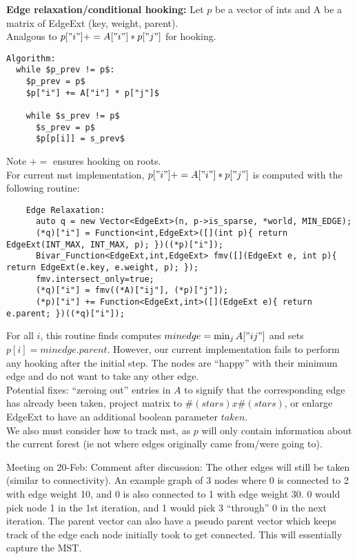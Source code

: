 \documentclass[11pt]{article}
\title{}
\author{}
\begin{document}
\maketitle

\textbf{Edge relaxation/conditional hooking:} Let $p$ be a vector of ints and A be a matrix of EdgeExt (key, weight, parent).\\
Analgous to $p["i"] += A["i"] * p["j"]$ for hooking.

\begin{lstlisting}
Algorithm:
  while $p_prev != p$:
    $p_prev = p$
    $p["i"] += A["i"] * p["j"]$

    while $s_prev != p$
      $s_prev = p$
      $p[p[i]] = s_prev$
\end{lstlisting}

Note $+=$ ensures hooking on roots.\\

For current mst implementation, $p["i"] += A["i"] * p["j"]$ is computed with the following routine:
\begin{lstlisting}
    Edge Relaxation:
      auto q = new Vector<EdgeExt>(n, p->is_sparse, *world, MIN_EDGE);
      (*q)["i"] = Function<int,EdgeExt>([](int p){ return EdgeExt(INT_MAX, INT_MAX, p); })((*p)["i"]);
      Bivar_Function<EdgeExt,int,EdgeExt> fmv([](EdgeExt e, int p){ return EdgeExt(e.key, e.weight, p); });
      fmv.intersect_only=true;
      (*q)["i"] = fmv((*A)["ij"], (*p)["j"]);
      (*p)["i"] += Function<EdgeExt,int>([](EdgeExt e){ return e.parent; })((*q)["i"]);
\end{lstlisting}

For all $i$, this routine finds computes $minedge = \min_{j} A["ij"]$ and sets $p[i] = minedge.parent$. However, our current implementation fails to perform any hooking after the initial step. The nodes are ``happy'' with their minimum edge and do not want to take any other edge.\\

Potential fixes: ``zeroing out'' entries in $A$ to signify that the corresponding edge has already been taken, project matrix to $\#(stars) x \#(stars)$, or enlarge EdgeExt to have an additional boolean parameter $taken$.\\

We also must consider how to track mst, as $p$ will only contain information about the current forest (ie not where edges originally came from/were going to).

Meeting on 20-Feb:
Comment after discussion: The other edges will still be taken (similar to connectivity). An example graph of 3 nodes where 0 is connected to 2 with edge weight 10, and 0 is also connected to 1 with edge weight 30. 0 would pick node 1 in the 1st iteration, and 1 would pick 3 ``through'' 0 in the next iteration.
The parent vector can also have a pseudo parent vector which keeps track of the edge each node initially took to get connected. This will essentially capture the MST.
\end{document}
